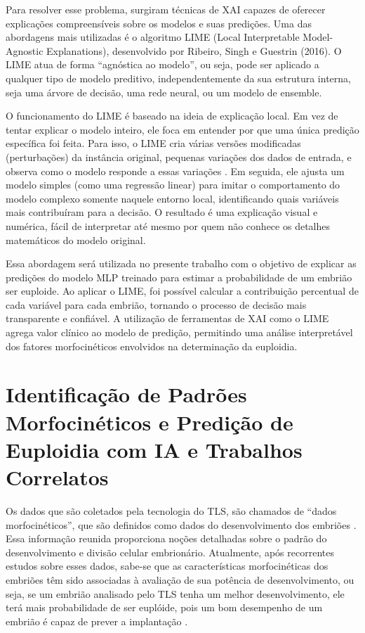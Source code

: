 Para resolver esse problema, surgiram técnicas de XAI capazes de oferecer explicações compreensíveis sobre os modelos e suas predições. Uma das abordagens mais utilizadas é o algoritmo LIME (Local Interpretable Model-Agnostic Explanations), desenvolvido por Ribeiro, Singh e Guestrin (2016). O LIME atua de forma “agnóstica ao modelo”, ou seja, pode ser aplicado a qualquer tipo de modelo preditivo, independentemente da sua estrutura interna, seja uma árvore de decisão, uma rede neural, ou um modelo de ensemble.

O funcionamento do LIME é baseado na ideia de explicação local. Em vez de tentar explicar o modelo inteiro, ele foca em entender por que uma única predição específica foi feita. Para isso, o LIME cria várias versões modificadas (perturbações) da instância original, pequenas variações dos dados de entrada, e observa como o modelo responde a essas variações \cite{ribeiro2016}. Em seguida, ele ajusta um modelo simples (como uma regressão linear) para imitar o comportamento do modelo complexo somente naquele entorno local, identificando quais variáveis mais contribuíram para a decisão. O resultado é uma explicação visual e numérica, fácil de interpretar até mesmo por quem não conhece os detalhes matemáticos do modelo original.

Essa abordagem será utilizada no presente trabalho com o objetivo de explicar as predições do modelo MLP treinado para estimar a probabilidade de um embrião ser euploide. Ao aplicar o LIME, foi possível calcular a contribuição percentual de cada variável para cada embrião, tornando o processo de decisão mais transparente e confiável. A utilização de ferramentas de XAI como o LIME agrega valor clínico ao modelo de predição, permitindo uma análise interpretável dos fatores morfocinéticos envolvidos na determinação da euploidia.

\section{Identificação de Padrões Morfocinéticos e Predição de Euploidia com IA e Trabalhos Correlatos}

Os dados que são coletados pela tecnologia do TLS, são chamados de “dados morfocinéticos”, que são definidos como dados do desenvolvimento dos embriões \cite{moustakli2024}. Essa informação reunida proporciona noções detalhadas sobre o padrão do desenvolvimento e divisão celular embrionário. Atualmente, após recorrentes estudos sobre esses dados, sabe-se que as características morfocinéticas dos embriões têm sido associadas à avaliação de sua potência de desenvolvimento, ou seja, se um embrião analisado pelo TLS tenha um melhor desenvolvimento, ele terá mais probabilidade de ser euplóide, pois um bom desempenho de um embrião é capaz de prever a implantação \cite{yuan2023}. 

